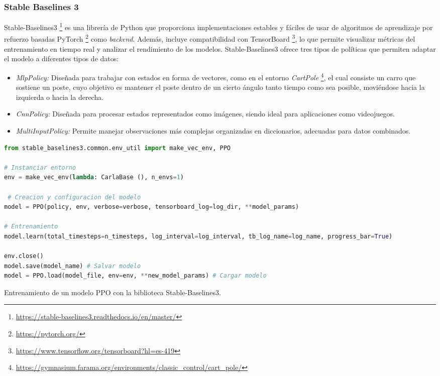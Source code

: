 \subsubsection{Stable Baselines 3}
\label{sec:stable_baselines3}

Stable-Baselines3 \footnote{\url{https://stable-baselines3.readthedocs.io/en/master/}} es una librería de Python que proporciona implementaciones estables y fáciles de usar de algoritmos de aprendizaje por refuerzo basadas PyTorch \footnote{\url{https://pytorch.org/}} como \textit{backend}. Además, incluye compatibilidad con TensorBoard \footnote{\url{https://www.tensorflow.org/tensorboard?hl=es-419}}, lo que permite visualizar métricas del entrenamiento en tiempo real y analizar el rendimiento de los modelos. Stable-Baselines3 ofrece tres tipos de políticas que permiten adaptar el modelo a diferentes tipos de datos:

\begin{itemize} 
\item \textit{MlpPolicy:} Diseñada para trabajar con estados en forma de vectores, como en el entorno \textit{CartPole} \footnote{\url{https://gymnasium.farama.org/environments/classic_control/cart_pole/}}, el cual consiste un carro que sostiene un poste, cuyo objetivo es mantener el poste dentro de un cierto ángulo tanto tiempo como sea posible, moviéndose hacia la izquierda o hacia la derecha. 
\item \textit{CnnPolicy:} Diseñada para procesar estados representados como imágenes, siendo ideal para aplicaciones como videojuegos.
\item \textit{MultiInputPolicy:} Permite manejar observaciones más complejas organizadas en diccionarios, adecuadas para datos combinados. 
\end{itemize} 

\begin{code}[h] \begin{lstlisting}[language=Python] 
from stable_baselines3.common.env_util import make_vec_env, PPO

# Instanciar entorno
env = make_vec_env(lambda: CarlaBase (), n_envs=1) 

 # Creacion y configuracion del modelo
model = PPO(policy, env, verbose=verbose, tensorboard_log=log_dir, **model_params)

# Entrenamiento
model.learn(total_timesteps=n_timesteps, log_interval=log_interval, tb_log_name=log_name, progress_bar=True) 

env.close()
model.save(model_name) # Salvar modelo
model = PPO.load(model_file, env=env, **new_model_params) # Cargar modelo
\end{lstlisting}
\caption[Ejemplo de código con Stable-Baselines3]{Entrenamiento de un modelo \ac{PPO} con la biblioteca Stable-Baselines3.} 
\label{cod:sb3} \end{code} 

